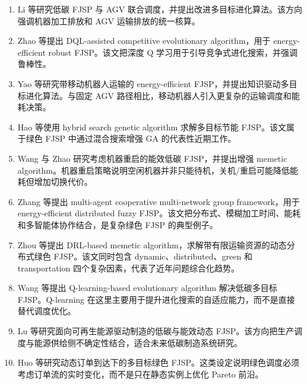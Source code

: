 \documentclass[UTF8,a4paper,11pt]{ctexart}
\begin{document}
\begin{enumerate}[label=\textbf{G\arabic*.},leftmargin=3em]
\item Li 等研究低碳 FJSP 与 AGV 联合调度，并提出改进多目标进化算法\cite{Li2024AGVLowCarbon}。该方向强调机器加工排放和 AGV 运输排放的统一核算。

\item Zhao 等提出 DQL-assisted competitive evolutionary algorithm，用于 energy-efficient robust FJSP\cite{Zhao2024ERFJSP}。该文把深度 Q 学习用于引导竞争式进化搜索，并强调鲁棒性。

\item Yao 等研究带移动机器人运输的 energy-efficient FJSP，并提出知识驱动多目标进化算法\cite{Yao2024MobileRobots}。与固定 AGV 路径相比，移动机器人引入更复杂的运输调度和能耗决策。

\item Hao 等使用 hybrid search genetic algorithm 求解多目标节能 FJSP\cite{Hao2025Energy}。该文属于绿色 FJSP 中通过混合搜索增强 GA 的代表性近期工作。

\item Wang 与 Zhao 研究考虑机器重启的能效低碳 FJSP，并提出增强 memetic algorithm\cite{Wang2025Restart}。机器重启策略说明空闲机器并非只能待机，关机/重启可能降低能耗但增加切换代价。

\item Zhang 等提出 multi-agent cooperative multi-network group framework，用于 energy-efficient distributed fuzzy FJSP\cite{Zhang2025CoopMultiNet}。该文把分布式、模糊加工时间、能耗和多智能体协作结合，是复杂绿色 FJSP 的典型例子。

\item Zhou 等提出 DRL-based memetic algorithm，求解带有限运输资源的动态分布式绿色 FJSP\cite{Zhou2025DRLMA}。该文同时包含 dynamic、distributed、green 和 transportation 四个复杂因素，代表了近年问题综合化趋势。

\item Wang 等提出 Q-learning-based evolutionary algorithm 解决低碳多目标 FJSP\cite{Wang2026QLEA}。Q-learning 在这里主要用于提升进化搜索的自适应能力，而不是直接替代调度优化。

\item Lu 等研究面向可再生能源驱动制造的低碳与能效动态 FJSP\cite{Lu2026Renewable}。该方向把生产调度与能源供给侧不确定性结合，适合未来低碳制造系统研究。

\item Huo 等研究动态订单到达下的多目标绿色 FJSP\cite{Huo2026Green}。这类设定说明绿色调度必须考虑订单流的实时变化，而不是只在静态实例上优化 Pareto 前沿。
\end{enumerate}
\end{document}
